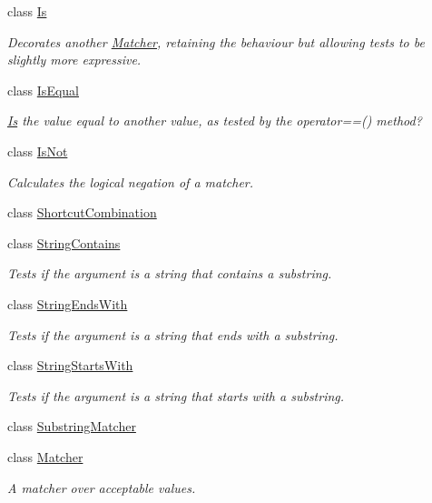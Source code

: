 \begin{DoxyCompactItemize}
class \hyperlink{class_hamcrest_qt_1_1_is}{Is}
\begin{DoxyCompactList}\small\item\em Decorates another \hyperlink{class_hamcrest_qt_1_1_matcher}{Matcher}, retaining the behaviour but allowing tests to be slightly more expressive. \end{DoxyCompactList}\item 
class \hyperlink{class_hamcrest_qt_1_1_is_equal}{Is\-Equal}
\begin{DoxyCompactList}\small\item\em \hyperlink{class_hamcrest_qt_1_1_is}{Is} the value equal to another value, as tested by the operator==() method? \end{DoxyCompactList}\item 
class \hyperlink{class_hamcrest_qt_1_1_is_not}{Is\-Not}
\begin{DoxyCompactList}\small\item\em Calculates the logical negation of a matcher. \end{DoxyCompactList}\item 
class \hyperlink{class_hamcrest_qt_1_1_shortcut_combination}{Shortcut\-Combination}
\item 
class \hyperlink{class_hamcrest_qt_1_1_string_contains}{String\-Contains}
\begin{DoxyCompactList}\small\item\em Tests if the argument is a string that contains a substring. \end{DoxyCompactList}\item 
class \hyperlink{class_hamcrest_qt_1_1_string_ends_with}{String\-Ends\-With}
\begin{DoxyCompactList}\small\item\em Tests if the argument is a string that ends with a substring. \end{DoxyCompactList}\item 
class \hyperlink{class_hamcrest_qt_1_1_string_starts_with}{String\-Starts\-With}
\begin{DoxyCompactList}\small\item\em Tests if the argument is a string that starts with a substring. \end{DoxyCompactList}\item 
class \hyperlink{class_hamcrest_qt_1_1_substring_matcher}{Substring\-Matcher}
\item 
class \hyperlink{class_hamcrest_qt_1_1_matcher}{Matcher}
\begin{DoxyCompactList}\small\item\em A matcher over acceptable values. \end{DoxyCompactList}\item 

\end{DoxyCompactItemize}
